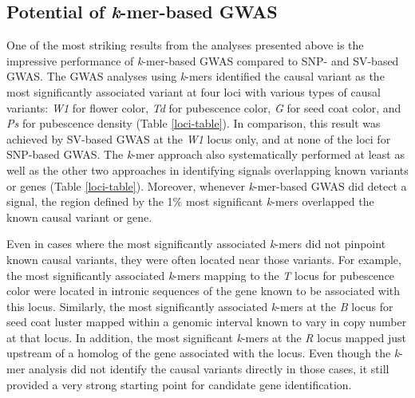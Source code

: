 \documentclass{article}
\begin{document}
\subsection*{Potential of \emph{k}-mer-based GWAS}

One of the most striking results from the analyses presented above is the
impressive performance of \emph{k}-mer-based GWAS compared to SNP- and SV-based
GWAS. The GWAS analyses using \emph{k}-mers identified the causal variant as
the most significantly associated variant at four loci with various types of
causal variants: \emph{W1} for flower color, \emph{Td} for pubescence color,
\emph{G} for seed coat color, and \emph{Ps} for pubescence density (Table
\ref{loci-table}). In comparison, this result was achieved by SV-based GWAS at
the \textit{W1} locus only, and at none of the loci for SNP-based GWAS.
The \textit{k}-mer approach also systematically performed at least as well as
the other two approaches in identifying signals overlapping known variants or
genes (Table \ref{loci-table}). Moreover, whenever \textit{k}-mer-based GWAS
did detect a signal, the region defined by the 1\% most significant
\textit{k}-mers overlapped the known causal variant or gene. 

Even in cases where the most significantly associated \emph{k}-mers did not
pinpoint known causal variants, they were often located near those variants.
For example, the most significantly associated \emph{k}-mers mapping to the
\emph{T} locus for pubescence color were located in intronic sequences of the
gene known to be associated with this locus.  Similarly, the most significantly
associated \emph{k}-mers at the \emph{B} locus for seed coat luster mapped
within a genomic interval known to vary in copy number at that locus. In
addition, the most significant \emph{k}-mers at the \emph{R} locus mapped just
upstream of a homolog of the gene associated with the locus. Even though the
\emph{k}-mer analysis did not identify the causal variants directly in those
cases, it still provided a very strong starting point for candidate gene
identification.
\end{document}

